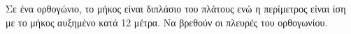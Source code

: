 Σε ένα ορθογώνιο, το μήκος είναι διπλάσιο του πλάτους ενώ η περίμετρος είναι ίση με το μήκος αυξημένο κατά 12 μέτρα. Να βρεθούν οι πλευρές του ορθογωνίου.
